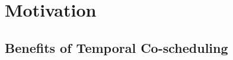 \section{Motivation}
\label{sec:motivation}




\subsection{Benefits of Temporal Co-scheduling}
\label{sec:ex}



